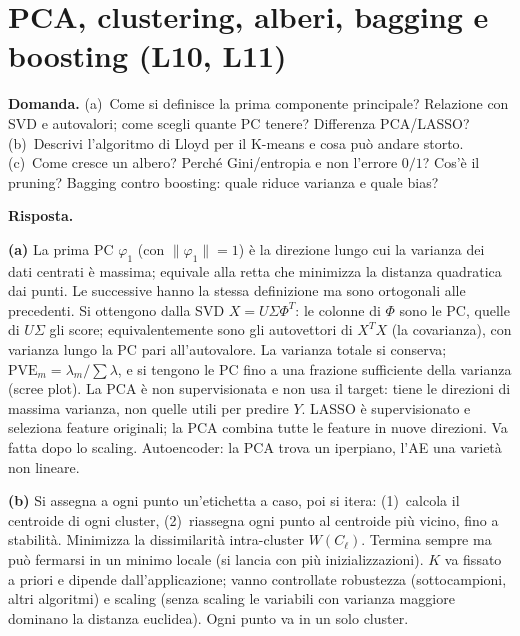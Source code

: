 \documentclass[11pt,a4paper]{article}
\newcommand{\Dom}[1]{\par\medskip\noindent\textbf{Domanda.} #1\par\nopagebreak}
\newcommand{\Ris}[1]{\noindent\textbf{Risposta.}\par\nopagebreak #1}
\begin{document}
\section{PCA, clustering, alberi, bagging e boosting (L10, L11)}

\Dom{(a)~Come si definisce la prima componente principale? Relazione con SVD e autovalori; come scegli quante PC tenere? Differenza PCA/LASSO?
(b)~Descrivi l'algoritmo di Lloyd per il K-means e cosa pu\`o andare storto.
(c)~Come cresce un albero? Perch\'e Gini/entropia e non l'errore $0/1$? Cos'\`e il pruning? Bagging contro boosting: quale riduce varianza e quale bias?}

\Ris{
\textbf{(a)} La prima PC $\varphi_1$ (con $\|\varphi_1\|=1$) \`e la direzione lungo cui la varianza dei dati centrati \`e massima; equivale alla retta che minimizza la distanza quadratica dai punti. Le successive hanno la stessa definizione ma sono ortogonali alle precedenti.
Si ottengono dalla SVD $X=U\Sigma\Phi^T$: le colonne di $\Phi$ sono le PC, quelle di $U\Sigma$ gli score; equivalentemente sono gli autovettori di $X^TX$ (la covarianza), con varianza lungo la PC pari all'autovalore.
La varianza totale si conserva; $\mathrm{PVE}_m=\lambda_m/\sum\lambda$, e si tengono le PC fino a una frazione sufficiente della varianza (scree plot).
La PCA \`e non supervisionata e non usa il target: tiene le direzioni di massima varianza, non quelle utili per predire $Y$. LASSO \`e supervisionato e seleziona feature originali; la PCA combina tutte le feature in nuove direzioni. Va fatta dopo lo scaling.
Autoencoder: la PCA trova un iperpiano, l'AE una variet\`a non lineare.

\textbf{(b)} Si assegna a ogni punto un'etichetta a caso, poi si itera: (1)~calcola il centroide di ogni cluster, (2)~riassegna ogni punto al centroide pi\`u vicino, fino a stabilit\`a.
Minimizza la dissimilarit\`a intra-cluster $W(C_\ell)$. Termina sempre ma pu\`o fermarsi in un minimo locale (si lancia con pi\`u inizializzazioni).
$K$ va fissato a priori e dipende dall'applicazione; vanno controllate robustezza (sottocampioni, altri algoritmi) e scaling (senza scaling le variabili con varianza maggiore dominano la distanza euclidea). Ogni punto va in un solo cluster.

}
\end{document}
